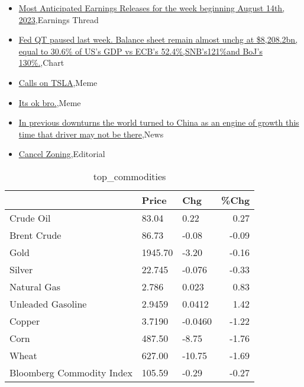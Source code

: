 \documentclass{article}%
\begin{document}
%
\begin{itemize}%
\item%
\href{https://reddit.com/r/wallstreetbets/comments/15p2hmk/most\_anticipated\_earnings\_releases\_for\_the\_week/}{Most Anticipated Earnings Releases for the week beginning August 14th, 2023},Earnings Thread%
\item%
\href{https://reddit.com/r/wallstreetbets/comments/15oyqsn/fed\_qt\_paused\_last\_week\_balance\_sheet\_remain/}{Fed QT paused last week. Balance sheet remain almost unchg at \$8,208.2bn, equal to 30.6\% of US's GDP vs ECB's 52.4\%,SNB's121\%and BoJ's 130\%.},Chart%
\item%
\href{https://reddit.com/r/wallstreetbets/comments/15owxwx/calls\_on\_tsla/}{Calls on TSLA},Meme%
\item%
\href{https://reddit.com/r/StockMarket/comments/15nwof4/its\_ok\_bro/}{Its ok bro.},Meme%
\item%
\href{https://reddit.com/r/Economics/comments/15ok2z1/in\_previous\_downturns\_the\_world\_turned\_to\_china/}{In previous downturns the world turned to China as an engine of growth  this time that driver may not be there},News%
\item%
\href{https://reddit.com/r/Economics/comments/15oc16u/cancel\_zoning/}{Cancel Zoning},Editorial%
\end{itemize}%


\begin{table}[htbp]%
\caption{top\_commodities}%
\centering%
\begin{adjustbox}{width=1\textwidth}%
\begin{tabular}{lllr}
\toprule
                          &   Price &     Chg &  \%Chg \\
\midrule
               Crude Oil  &   83.04 &    0.22 &  0.27 \\
             Brent Crude  &   86.73 &   -0.08 & -0.09 \\
                    Gold  & 1945.70 &   -3.20 & -0.16 \\
                  Silver  &  22.745 &  -0.076 & -0.33 \\
             Natural Gas  &   2.786 &   0.023 &  0.83 \\
       Unleaded Gasoline  &  2.9459 &  0.0412 &  1.42 \\
                  Copper  &  3.7190 & -0.0460 & -1.22 \\
                    Corn  &  487.50 &   -8.75 & -1.76 \\
                   Wheat  &  627.00 &  -10.75 & -1.69 \\
Bloomberg Commodity Index &  105.59 &   -0.29 & -0.27 \\
\bottomrule
\end{tabular}
%
\end{adjustbox}%
\end{table}
\end{document}
